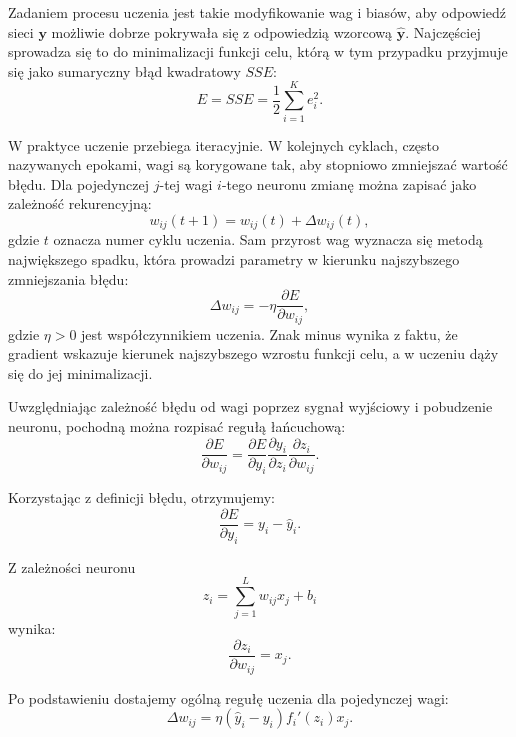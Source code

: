 \documentclass[12pt,twoside]{article}
\begin{document}
Zadaniem procesu uczenia jest takie modyfikowanie wag i biasów, aby odpowiedź sieci $\mathbf{y}$ możliwie dobrze pokrywała się z odpowiedzią wzorcową $\hat{\mathbf{y}}$. Najczęściej sprowadza się to do minimalizacji funkcji celu, którą w tym przypadku przyjmuje się jako sumaryczny błąd kwadratowy $SSE$:
\begin{equation}
E = SSE = \frac{1}{2}\sum_{i=1}^{K} e_i^2.
\end{equation}

W praktyce uczenie przebiega iteracyjnie. W kolejnych cyklach, często nazywanych epokami, wagi są korygowane tak, aby stopniowo zmniejszać wartość błędu. Dla pojedynczej $j$-tej wagi $i$-tego neuronu zmianę można zapisać jako zależność rekurencyjną:
\begin{equation}
 w_{ij}(t+1) = w_{ij}(t) + \Delta w_{ij}(t),
\end{equation}
gdzie $t$ oznacza numer cyklu uczenia. Sam przyrost wag wyznacza się metodą największego spadku, która prowadzi parametry w kierunku najszybszego zmniejszania błędu:
\begin{equation}
\Delta w_{ij} = -\eta \frac{\partial E}{\partial w_{ij}},
\end{equation}
gdzie $\eta>0$ jest współczynnikiem uczenia. Znak minus wynika z faktu, że gradient wskazuje kierunek najszybszego wzrostu funkcji celu, a w uczeniu dąży się do jej minimalizacji.

Uwzględniając zależność błędu od wagi poprzez sygnał wyjściowy i pobudzenie neuronu, pochodną można rozpisać regułą łańcuchową:
\begin{equation}
\frac{\partial E}{\partial w_{ij}} = \frac{\partial E}{\partial y_i}\frac{\partial y_i}{\partial z_i}\frac{\partial z_i}{\partial w_{ij}}.
\end{equation}

Korzystając z definicji błędu, otrzymujemy:
\begin{equation}
\frac{\partial E}{\partial y_i} = y_i - \hat{y}_i.
\end{equation}

Z zależności neuronu
\begin{equation}
z_i = \sum_{j=1}^{L} w_{ij}x_j + b_i
\end{equation}
wynika:
\begin{equation}
\frac{\partial z_i}{\partial w_{ij}} = x_j.
\end{equation}

Po podstawieniu dostajemy ogólną regułę uczenia dla pojedynczej wagi:
\begin{equation}
\Delta w_{ij} = \eta\left(\hat{y}_i - y_i\right) f_i'\!\left(z_i\right) x_j.
\end{equation}
\end{document}
